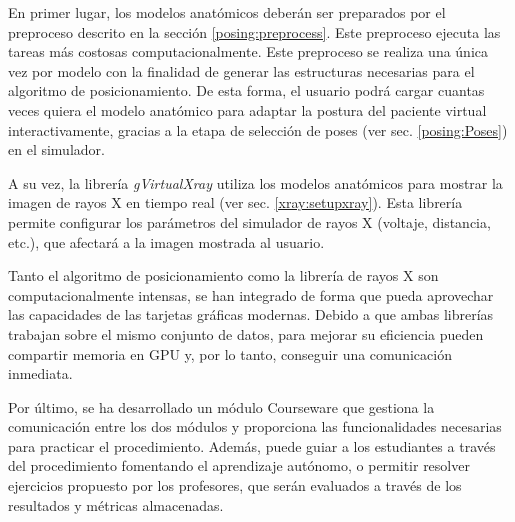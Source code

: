 En primer lugar, los modelos anatómicos deberán ser preparados por el preproceso descrito en la sección \ref{posing:preprocess}. Este preproceso ejecuta las tareas más costosas computacionalmente. Este preproceso se realiza una única vez por modelo con la finalidad de generar las estructuras necesarias para el algoritmo de posicionamiento. De esta forma, el usuario podrá cargar cuantas veces quiera el modelo anatómico para adaptar la postura del paciente virtual interactivamente, gracias a la etapa de selección de poses (ver sec. \ref{posing:Poses}) en el simulador. 



A su vez, la librería \emph{gVirtualXray} utiliza los modelos anatómicos para mostrar la imagen de rayos X en tiempo real (ver sec. \ref{xray:setupxray}). Esta librería permite configurar los parámetros del simulador de rayos X (voltaje, distancia, etc.), que afectará a la imagen mostrada al usuario. 

Tanto el algoritmo de posicionamiento como la librería de rayos X son computacionalmente intensas, se han integrado de forma que pueda aprovechar las capacidades de las tarjetas gráficas modernas. Debido a que ambas librerías trabajan sobre el mismo conjunto de datos, para mejorar su eficiencia pueden compartir memoria en \acs{GPU} y, por lo tanto, conseguir una comunicación inmediata.

Por último, se ha desarrollado un módulo \ac{Courseware} que gestiona la comunicación entre los dos módulos y proporciona las funcionalidades necesarias para practicar el procedimiento. Además, puede guiar a los estudiantes a través del procedimiento fomentando el aprendizaje autónomo, o permitir resolver ejercicios propuesto por los profesores, que serán evaluados a través de los resultados y métricas almacenadas.







